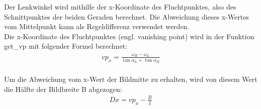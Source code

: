 	Der Lenkwinkel wird mithilfe der x-Koordinate des Fluchtpunktes, also des Schnittpunktes der beiden Geraden berechnet. Die Abweichung dieses x-Wertes vom Mittelpunkt kann als Regeldifferenz verwendet werden.\\
	Die x-Koordinate des Fluchtpunktes (engl. vanishing point) wird in der Funktion get\_vp mit folgender Formel berechnet:\\
	
	\begin{align*}
	vp_x=\frac{\omega_R-\omega_L}{\tan{\alpha_L}+\tan{\alpha_R}} \\
	\end{align*}
	
	Um die Abweichung vom x-Wert der Bildmitte zu erhalten, wird von diesem Wert die Hälfte der Bildbreite B abgezogen:\\
	
	\begin{align*}
	Dx=vp_x-\frac{B}{2} \\
	\end{align*}
	
	
	
	
	
	
	
	
	